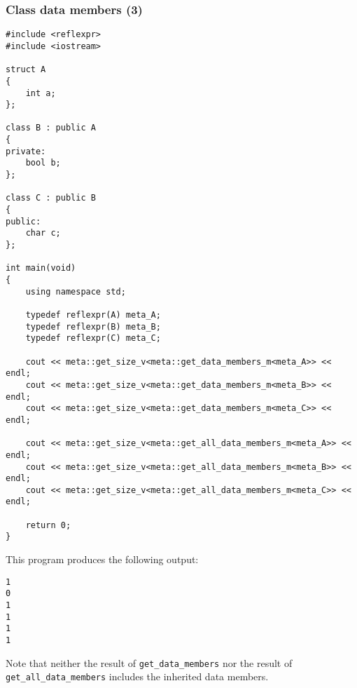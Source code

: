 \subsubsection{Class data members (3)}

\begin{verbatim}
#include <reflexpr>
#include <iostream>

struct A
{
	int a;
};

class B : public A
{
private:
	bool b;
};

class C : public B
{
public:
	char c;
};

int main(void)
{
	using namespace std;

	typedef reflexpr(A) meta_A;
	typedef reflexpr(B) meta_B;
	typedef reflexpr(C) meta_C;

	cout << meta::get_size_v<meta::get_data_members_m<meta_A>> << endl;
	cout << meta::get_size_v<meta::get_data_members_m<meta_B>> << endl;
	cout << meta::get_size_v<meta::get_data_members_m<meta_C>> << endl;

	cout << meta::get_size_v<meta::get_all_data_members_m<meta_A>> << endl;
	cout << meta::get_size_v<meta::get_all_data_members_m<meta_B>> << endl;
	cout << meta::get_size_v<meta::get_all_data_members_m<meta_C>> << endl;

	return 0;
}
\end{verbatim}

This program produces the following output:

\begin{verbatim}
1
0
1
1
1
1
\end{verbatim}

Note that neither the result of \texttt{get\_data\_members} nor the result of
\texttt{get\_all\_data\_members} includes the inherited data members.
